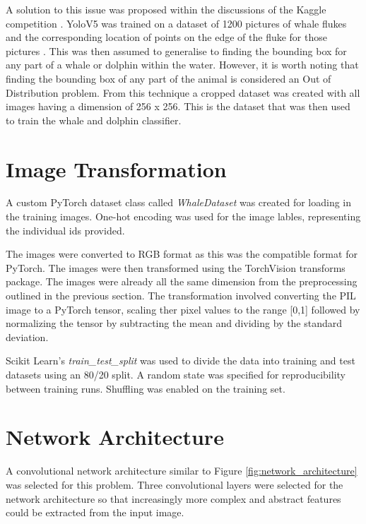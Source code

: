 \documentclass{article}
\begin{document}
A solution to this issue was proposed within the discussions of the Kaggle competition \cite{cropped_dataset_kaggle}. YoloV5 was trained on a dataset of 1200 pictures of whale flukes and the corresponding location of points on the edge of the fluke for those pictures \cite{whale_fluke_dataset}. 
This was then assumed to generalise to finding the bounding box for any part of a whale or dolphin within the water. However, it is worth noting that finding the bounding box of any part of the animal is considered an Out of Distribution problem. From this technique a cropped dataset was created with all images having a dimension of 256 x 256. This is the dataset that was then used to train the whale 
and dolphin classifier.


\section {Image Transformation}

A custom PyTorch dataset class called \emph{WhaleDataset} was created for loading in the training images. One-hot encoding was used for the image lables, representing the individual ids provided.

The images were converted to RGB format as this was the compatible format for PyTorch. The images were then transformed using the TorchVision transforms package. The images were already all the same dimension from the preprocessing outlined in the previous section. 
The transformation involved converting the PIL image to a PyTorch tensor, scaling ther pixel values to the range [0,1] followed by normalizing the tensor by subtracting the mean and dividing by the standard deviation.

Scikit Learn's \emph{train\_test\_split} was used to divide the data into training and test datasets using an 80/20 split. A random state was specified for reproducibility between training runs. Shuffling was enabled on the training set.


\section{Network Architecture}

A convolutional network architecture similar to Figure \ref{fig:network_architecture}  was selected for this problem. Three convolutional layers were selected for the network architecture so that increasingly more complex and 
abstract features could be extracted from the input image.
\end{document}
